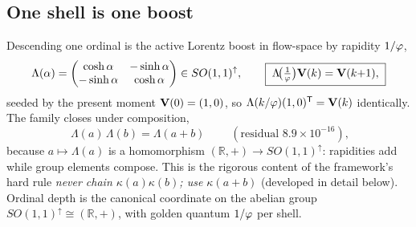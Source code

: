 \subsection{One shell is one boost}

Descending one ordinal is the active Lorentz boost in flow-space by rapidity $1/\varphi$,
\begin{equation}
\Lambda(\alpha)=\begin{pmatrix}\cosh\alpha&-\sinh\alpha\\-\sinh\alpha&\cosh\alpha\end{pmatrix}\in SO(1,1)^{\uparrow},
\qquad \boxed{\;\Lambda\!\big(\tfrac{1}{\varphi}\big)\mathbf{V}(k)=\mathbf{V}(k{+}1),\;}
\label{eq:twovector:boostlaw}
\end{equation}
seeded by the present moment $\mathbf{V}(0)=(1,0)$, so $\Lambda(k/\varphi)(1,0)^{\mathsf T}=\mathbf{V}(k)$
identically. The family closes under composition,
\begin{equation}
\boxed{\;\Lambda(a)\,\Lambda(b)=\Lambda(a{+}b)\;}\qquad(\text{residual }8.9\times10^{-16}),
\label{eq:twovector:group}
\end{equation}
because $a\mapsto\Lambda(a)$ is a homomorphism $(\mathbb R,+)\to SO(1,1)^{\uparrow}$:
rapidities add while group elements compose. This is the rigorous content of the framework's
hard rule \emph{never chain $\kappa(a)\kappa(b)$; use $\kappa(a{+}b)$} (developed in detail
below). Ordinal depth is the canonical coordinate on the abelian group
$SO(1,1)^{\uparrow}\cong(\mathbb R,+)$, with golden quantum $1/\varphi$ per shell.

